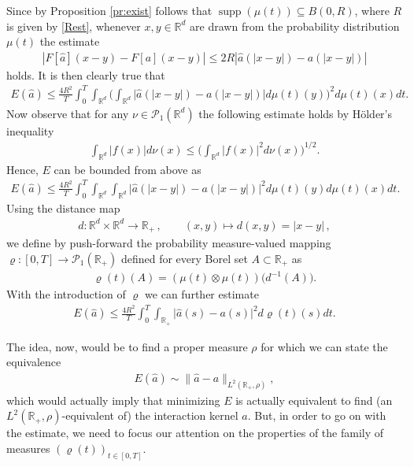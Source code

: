 \documentclass[A4paper,11pt]{article}
\theoremstyle{definition}
\newcommand{\R}{\mathbb{R}}
\DeclareMathOperator{\supp}{supp}
\begin{document}
Since by Proposition \ref{pr:exist} follows that $\supp(\mu(t)) \subseteq B(0,R)$, where $R$ is given by \eqref{Rest}, whenever $x,y \in \R^d$ are drawn from the probability distribution $\mu(t)$ the estimate
\begin{align*}
|F[\widehat a](x-y) - F[a](x-y)|\leq 2R|\widehat a(|x-y|) - a(|x-y|)|
\end{align*}
holds. It is then clearly true that
\begin{align*}
	E(\widehat a)
		\leq\frac{4R^2}{T}\int_0^T\int_{\R^d}\biggl(\int_{\R^d}\bigl|\widehat a(|x-y|)-a(|x-y|)\bigr|
			d\mu(t)(y)\biggr)^2 d\mu(t)(x) dt.
\end{align*}
Now observe that for any $\nu\in \mathcal{P}_1(\R^d)$ the following estimate holds by H\"older's inequality
\begin{align*}
	\int_{\R^d}|f(x)|d\nu(x)\leq\biggl(\int_{\R^d}|f(x)|^2 d\nu(x)\biggr)^{1/2}.
\end{align*}
Hence, $E$ can be bounded from above as
\begin{align*}
	E(\widehat a)\leq\frac{4R^2}{T}\int_0^T\int_{\R^d}\int_{\R^d}\bigl|\widehat a(|x-y|)-a(|x-y|)
		\bigr|^2 d\mu(t)(y) d\mu(t)(x) dt.
\end{align*}
Using the distance map
\begin{align*}
	d:\R^d\times\R^d\rightarrow\R_+\,,\qquad (x,y)\mapsto d(x,y)=|x-y|\,,
\end{align*}
we define by push-forward the probability measure-valued mapping $\varrho:[0,T]\rightarrow \mathcal{P}_1(\R_+)$ defined for every Borel set $A\subset\R_+$ as
\begin{align*}
	\varrho(t)(A)=(\mu(t)\otimes\mu(t))\bigl(d^{-1}(A)\bigr).
\end{align*}
With the introduction of $\varrho$ we can further estimate
\begin{align}\label{midpoint}
	E(\widehat a)\leq\frac{4R^2}{T}\int_0^T\int_{\R_+}\bigl|\widehat a(s)-a(s)\bigr|^2 d\varrho(t)(s) dt.
\end{align}

The idea, now, would be to find a proper measure $\rho$ for which we can state the equivalence
\begin{align*}
E(\widehat a) \sim \|\widehat a - a\|_{L^2(\R_+,\rho)},
\end{align*}
which would actually imply that minimizing $E$ is actually equivalent to find (an $L^2(\R_+,\rho)$-equivalent of) the interaction kernel $a$. But, in order to go on with the estimate, we need to focus our attention on the properties of the family of measures $(\varrho(t))_{t \in [0,T]}$.
\end{document}

